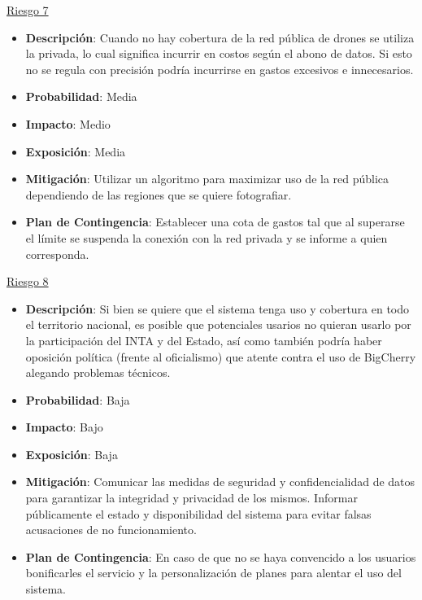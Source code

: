 \underline{Riesgo 7}

\begin{itemize} \itemsep -2pt
    \item \textbf{Descripción}: Cuando no hay cobertura de la red pública de drones se utiliza la privada, lo cual significa incurrir en costos según el abono de datos. Si esto no se regula con precisión podría incurrirse en gastos excesivos e innecesarios.
    \item \textbf{Probabilidad}: Media
    \item \textbf{Impacto}: Medio
    \item \textbf{Exposición}: Media
    \item \textbf{Mitigación}: Utilizar un algoritmo para maximizar uso de la red pública dependiendo de las regiones que se quiere fotografiar.
    \item \textbf{Plan de Contingencia}: Establecer una cota de gastos tal que al superarse el límite se suspenda la conexión con la red privada y se informe a quien corresponda.
\end{itemize}

\underline{Riesgo 8}

\begin{itemize} \itemsep -2pt
    \item \textbf{Descripción}: Si bien se quiere que el sistema tenga uso y cobertura en todo el territorio nacional, es posible que potenciales usarios no quieran usarlo por la participación del INTA y del Estado, así como también podría haber oposición política (frente al oficialismo) que atente contra el uso de BigCherry alegando problemas técnicos.
    \item \textbf{Probabilidad}: Baja
    \item \textbf{Impacto}: Bajo
    \item \textbf{Exposición}: Baja
    \item \textbf{Mitigación}: Comunicar las medidas de seguridad y confidencialidad de datos para garantizar la integridad y privacidad de los mismos. Informar públicamente el estado y disponibilidad del sistema para evitar falsas acusaciones de no funcionamiento.
    \item \textbf{Plan de Contingencia}: En caso de que no se haya convencido a los usuarios bonificarles el servicio y la personalización de planes para alentar el uso del sistema.
\end{itemize}
